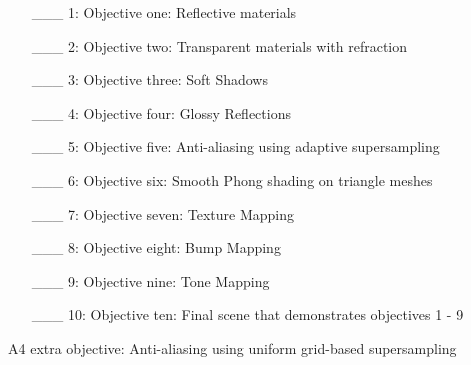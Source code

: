 \documentclass {article}
\begin{document}
\begin{enumerate}
     \item[\_\_\_ 1:]  Objective one: Reflective materials

     \item[\_\_\_ 2:]  Objective two: Transparent materials with refraction

     \item[\_\_\_ 3:]  Objective three: Soft Shadows
     
     \item[\_\_\_ 4:]  Objective four: Glossy Reflections

     \item[\_\_\_ 5:]  Objective five: Anti-aliasing using adaptive supersampling

     \item[\_\_\_ 6:]  Objective six: Smooth Phong shading on triangle meshes

     \item[\_\_\_ 7:]  Objective seven: Texture Mapping

     \item[\_\_\_ 8:]  Objective eight: Bump Mapping

     \item[\_\_\_ 9:]  Objective nine: Tone Mapping

     \item[\_\_\_ 10:]  Objective ten:  Final scene that demonstrates objectives 1 - 9
\end{enumerate}

A4 extra objective: Anti-aliasing using uniform grid-based supersampling
\end{document}
